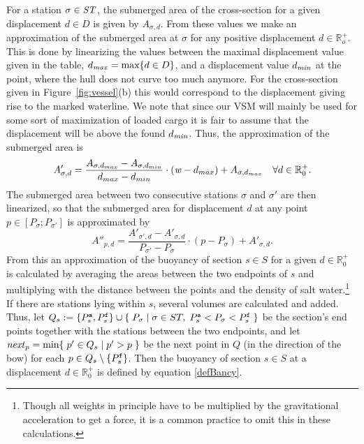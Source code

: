 For a station $\sigma\in\mathit{ST}$, the submerged area of the cross-section for a given displacement $d\in D$ is given by $A_{\sigma,d}$. From these values we make an approximation of the submerged area at $\sigma$ for any positive displacement $d\in \mathbb{R}_o^+$. This is done by linearizing the values between the maximal displacement value given in the table, $d_\mathit{max}=\text{max}\{d\in D\}$, and a displacement value $d_\mathit{min}$ at the point, where the hull does not curve too much anymore. For the cross-section given in Figure~\ref{fig:vessel}(b) this would correspond to the displacement giving rise to the marked waterline. We note that since our VSM will mainly be used for some sort of maximization of loaded cargo it is fair to assume that the displacement will be above the found $d_\mathit{min}$. Thus, the approximation of the submerged area is  
\[
A'_{\sigma,d} = \frac{A_{\sigma,d_{max}} - A_{\sigma,d_{min}}}{d_{max} - d_{min}} \cdot (\mathit{w} - d_{max}) + A_{\sigma,d_{max}} \quad \forall d\in \mathbb{R}^+_0.
\]
The submerged area between two consecutive stations $\sigma$ and $\sigma'$ are then linearized, so that the submerged area for displacement $d$ at any point $p\in[P_\sigma;P_{\sigma'}]$ is approximated by
\[
A''_{p,d} = \frac{A'_{\sigma',d}-A'_{\sigma,d}}{P_{\sigma'}-P_\sigma}\cdot(p-P_\sigma) + A'_{\sigma,d}.
\]
From this an approximation of the buoyancy of section $s\in S$ for a given $d\in \mathbb{R}^+_0$ is calculated by averaging the areas between the two endpoints of $s$ and multiplying with the distance between the points and the density of salt water.\footnote{Though all weights in principle have to be multiplied by the gravitational acceleration to get a force, it is a common practice to omit this in these calculations.} If there are stations lying within $s$, several volumes are calculated and added. Thus, let $Q_s := \{P^{\texttt{a}}_s, P^{\texttt{f}}_s\} \cup \{\;{P_\sigma}\;|\;{\sigma\in ST,\; P^{\texttt{a}}_s < P_\sigma < P^{\texttt{f}}_s}\;\}$ be the section's end points together with the stations between the two endpoints, and let $\mathit{next}_p = \min\{\;{p' \in Q_s}\;|\;{p' > p}\;\}$ be the next point in $Q$ (in the direction of the bow) for each $p \in Q_s\setminus \{P^{\texttt{f}}_s\}$. Then the buoyancy of section $s\in S$ at a displacement $d\in\mathbb{R}^+_0$ is defined by equation \eqref{defBancy}. 

